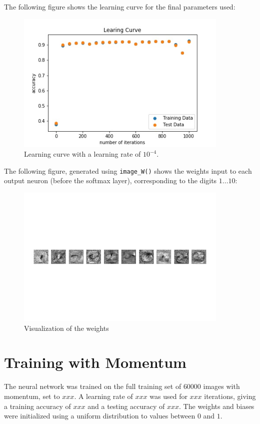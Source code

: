 \documentclass{article}
\begin{document}
   The following figure shows the learning curve for the final parameters used:
     \begin{figure}[H] \centering
         \includegraphics[width=4in]{resources/part4}
         \caption{Learning curve with a learning rate of $10^{-4}$. }
      \end{figure}

  The following figure, generated using \texttt{image\_W()} shows the weights input to each
  output neuron (before the softmax layer), corresponding to the digits $1...10$:
     \begin{figure}[H] \centering
         \includegraphics[width=4in]{resources/weights}
         \caption{Visualization of the weights }
      \end{figure}





   \section{Training with Momentum}
   The neural network was trained on the full training set of $60000$ images with momentum, set to $xxx$.
   A learning rate of $xxx$ was used for $xxx$ iterations, giving a training accuracy of $xxx$
   and a testing accuracy of $xxx$.
   The weights and biases were initialized using a uniform distribution to values between $0$ and $1$.
\end{document}
